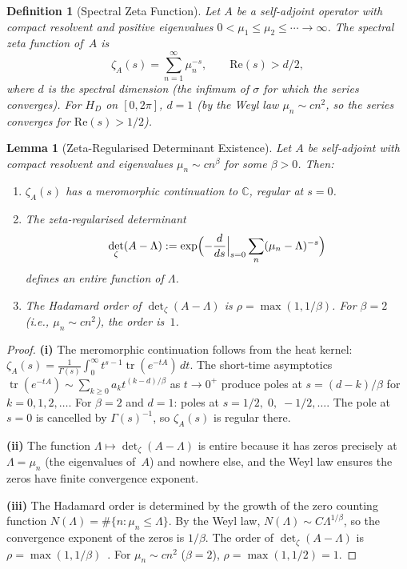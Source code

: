 \documentclass[11pt,a4paper]{article}
\theoremstyle{plain}
\newtheorem{lemma}[theorem]{Lemma}
\newtheorem{definition}[theorem]{Definition}
\theoremstyle{remark}
\newcommand{\C}{\mathbb{C}}
\DeclareMathOperator{\tr}{tr}
\begin{document}
\begin{definition}[Spectral Zeta Function]\label{def:spectral-zeta}
Let $A$ be a self-adjoint operator with compact resolvent and positive
eigenvalues $0<\mu_1\leq\mu_2\leq\cdots\to\infty$.  The \emph{spectral
zeta function} of~$A$ is
\begin{equation}\label{eq:spectral-zeta}
  \zeta_A(s)=\sum_{n=1}^\infty\mu_n^{-s},\qquad\mathrm{Re}(s)>d/2,
\end{equation}
where $d$ is the spectral dimension (the infimum of $\sigma$ for which
the series converges).  For $H_D$ on $[0,2\pi]$, $d=1$ (by the Weyl
law $\mu_n\sim cn^2$, so the series converges for $\mathrm{Re}(s)>1/2$).
\end{definition}

\begin{lemma}[Zeta-Regularised Determinant Existence]\label{lem:zeta-det}
Let $A$ be self-adjoint with compact resolvent and eigenvalues
$\mu_n\sim cn^\beta$ for some $\beta>0$.  Then:
\begin{enumerate}[nosep,label=(\roman*)]
  \item $\zeta_A(s)$ has a meromorphic continuation to $\C$, regular at $s=0$.
  \item The \emph{zeta-regularised determinant}
        \begin{equation}\label{eq:zeta-det-def}
          \det_\zeta(A-\Lambda):=\exp\Bigl(-\frac{d}{ds}\Bigr|_{s=0}
          \sum_n(\mu_n-\Lambda)^{-s}\Bigr)
        \end{equation}
        defines an entire function of $\Lambda$.
  \item The Hadamard order of $\det_\zeta(A-\Lambda)$ is
        $\rho=\max(1,1/\beta)$.  For $\beta=2$ (i.e., $\mu_n\sim cn^2$),
        the order is~$1$.
\end{enumerate}
\end{lemma}

\begin{proof}
\textbf{(i)} The meromorphic continuation follows from the heat kernel:
$\zeta_A(s)=\frac{1}{\Gamma(s)}\int_0^\infty t^{s-1}\tr(e^{-tA})\,dt$.
The short-time asymptotics $\tr(e^{-tA})\sim\sum_{k\geq 0}a_k t^{(k-d)/\beta}$
as $t\to 0^+$ produce poles at $s=(d-k)/\beta$ for $k=0,1,2,\ldots$.
For $\beta=2$ and $d=1$: poles at $s=1/2,\;0,\;-1/2,\ldots$.
The pole at $s=0$ is cancelled by $\Gamma(s)^{-1}$, so $\zeta_A(s)$ is
regular there.

\textbf{(ii)} The function $\Lambda\mapsto\det_\zeta(A-\Lambda)$ is entire
because it has zeros precisely at $\Lambda=\mu_n$ (the eigenvalues of~$A$)
and nowhere else, and the Weyl law ensures the zeros have finite
convergence exponent.

\textbf{(iii)} The Hadamard order is determined by the growth of the zero
counting function $N(\Lambda)=\#\{n:\mu_n\leq\Lambda\}$.  By the Weyl
law, $N(\Lambda)\sim C\Lambda^{1/\beta}$, so the convergence exponent
of the zeros is $1/\beta$.  The order of $\det_\zeta(A-\Lambda)$ is
$\rho=\max(1,1/\beta)$~\cite{simon2005}.
For $\mu_n\sim cn^2$ ($\beta=2$), $\rho=\max(1,1/2)=1$.
\end{proof}
\end{document}
